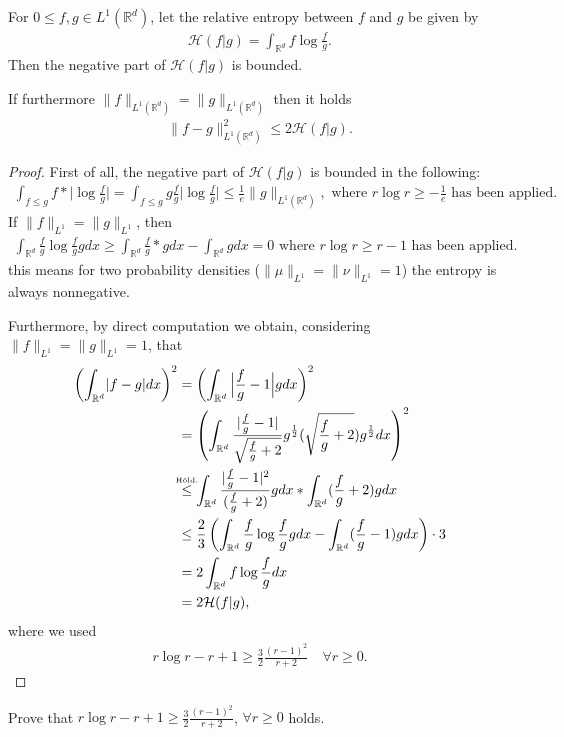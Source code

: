 \begin{lemma}
	For $0\le f,g \in  L^{1}(\mathbb{R}^{d} ) $, let the relative entropy between $f$ and $g$ be given by
	\begin{align*}
	\mathcal{H}(f | g) = \int_{\mathbb{R}^{d} } f \log \frac{f}{g}
	.\end{align*}
	Then the negative part of $\mathcal{H}(f|g)$ is bounded.
	
	If furthermore $\|f\|_{L^{1}(\mathbb{R}^{d} ) } = \|g\|_{L^{1} (\mathbb{R}^{d} )}$ then it holds 
	\begin{align*}
	\|f-g\|_{L^{1}(\mathbb{R}^{d} ) }^2 \le 2 \mathcal{H}(f | g)
	.\end{align*}
\end{lemma}
\begin{proof}
First of all, the negative part of $\mathcal{H}(f|g)$ is bounded in the following:
\begin{align*}
\int_{f \le g} f * \Big|\log \frac{f}{g}\Big| =  \int_{f \le  g} g \frac{f}{g} \Big|\log  \frac{f}{g}\Big| \le  \frac{1}{e} \|g\|_{L^{1}(\mathbb{R}^{d} ) }, \mbox{ where }	r \log  r \ge  -\frac{1}{e} \mbox{ has been applied.}
\end{align*}
If $\|f\|_{L^{1}} = \|g\|_{L^{1} } $, then
\begin{align*}
\int_{\mathbb{R}^{d} } \frac{f}{g} \log  \frac{f}{g} g dx \ge \int_{\mathbb{R}^{d} }   \frac{f}{g} * g dx - \int_{\mathbb{R}^{d} }  g dx = 0 \mbox{ where }	r \log  r \ge r-1 \mbox{ has been applied.}
\end{align*}
this means for two probability densities ($\|\mu \|_{L^{1} }=\|\nu \|_{L^{1} } = 1$) the entropy is always nonnegative.

Furthermore, by direct computation we obtain, considering   $\|f\|_{L^{1}} = \|g\|_{L^{1} } =1$, that
	\begin{align*}
	\left( \int_{\mathbb{R}^{d} }  \abs{f-g} dx \right)^2 &=  \left( \int_{\mathbb{R}^{d} }   \Big|\frac{f}{g} - 1\Big| g  dx\right) ^2\\
	&= \left( \int_{\mathbb{R}^{d} }   \frac{\abs{\frac{f}{g} - 1}}{\sqrt{\frac{f}{g} + 2}} g^{\frac{1}{2}}(\sqrt{\frac{f}{g}+2})g^{\frac{1}{2}} dx  \right) ^2\\
	&\myS{Höld.}{\le } \int_{\mathbb{R}^{d} }  \frac{\abs{\frac{f}{g}-1}^2}{(\frac{f}{g}+2)}g dx *\int_{\mathbb{R}^{d} } (\frac{f}{g} + 2)g dx\\
	&\le   \frac{2}{3} \left( \int_{\mathbb{R}^{d} } \frac{f}{g} \log \frac{f}{g} g dx - \int_{\mathbb{R}^{d} }  (\frac{f}{g} - 1) g dx \right) \cdot 3\\
	&= 2 \int_{\mathbb{R}^{d} }  f \log \frac{f}{g} dx\\
	&= 2 \mathcal{H}(f|g)
	,\end{align*}
where we used 
	\begin{align*}
	r \log  r - r + 1 \ge  \frac{3}{2} \frac{(r-1)^2}{r+2} \quad \forall  r \ge 0
	.\end{align*}
\end{proof}
\begin{exercise}
	Prove that $	r \log  r - r + 1 \ge  \frac{3}{2} \frac{(r-1)^2}{r+2}$, $\forall  r \ge 0$ holds.
\end{exercise}

